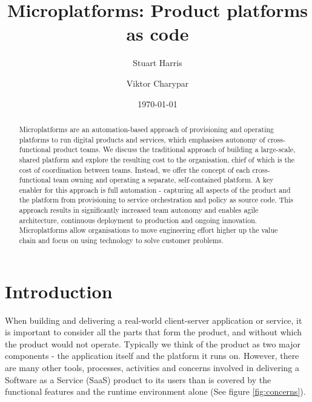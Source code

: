 \documentclass[reprint,amsmath,amssymb,aps]{revtex4-1}
\begin{document}

\title{Microplatforms: Product platforms as code}%

\author{Stuart Harris}
\author{Viktor Charypar}%

\date{\today}

\begin{abstract}
	Microplatforms are an automation-based approach of provisioning and operating platforms to run digital products and services, which emphasises autonomy of cross-functional product teams. We discuss the traditional approach of building a large-scale, shared platform and explore the resulting cost to the organisation, chief of which is the cost of coordination between teams. Instead, we offer the concept of each cross-functional team owning and operating a separate, self-contained platform. A key enabler for this approach is full automation - capturing all aspects of the product and the platform from provisioning to service orchestration and policy as source code. This approach results in significantly increased team autonomy and enables agile architecture, continuous deployment to production and ongoing innovation. Microplatforms allow organisations to move engineering effort higher up the value chain and focus on using technology to solve customer problems.
\end{abstract}

\maketitle


\section*{Introduction}
\label{sec:introduction}

When building and delivering a real-world client-server application or service, it is important to consider all the parts that form the product, and without which the product would not operate. Typically we think of the product as two major components - the application itself and the platform it runs on. However, there are many other tools, processes, activities and concerns involved in delivering a Software as a Service (SaaS) product to its users than is covered by the functional features and the runtime environment alone (See figure \ref{fig:concerns}).
\end{document}
